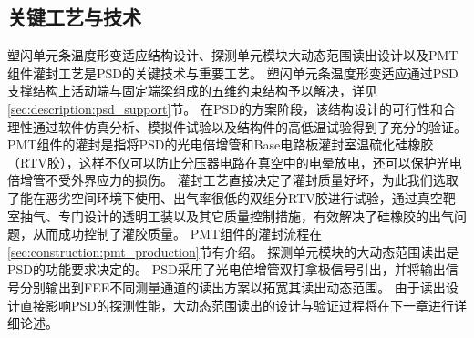 \subsection{关键工艺与技术}
塑闪单元条温度形变适应结构设计、探测单元模块大动态范围读出设计以及PMT组件灌封工艺是PSD的关键技术与重要工艺。
塑闪单元条温度形变适应通过PSD支撑结构上活动端与固定端梁组成的五维约束结构予以解决，详见\ref{sec:description:psd_support}节。
在PSD的方案阶段，该结构设计的可行性和合理性通过软件仿真分析、模拟件试验以及结构件的高低温试验得到了充分的验证。
PMT组件的灌封是指将PSD的光电倍增管和Base电路板灌封室温硫化硅橡胶（RTV胶），这样不仅可以防止分压器电路在真空中的电晕放电，还可以保护光电倍增管不受外界应力的损伤。
灌封工艺直接决定了灌封质量好坏，为此我们选取了能在恶劣空间环境下使用、出气率很低的双组分RTV胶进行试验，通过真空靶室抽气、专门设计的透明工装以及其它质量控制措施，有效解决了硅橡胶的出气问题，从而成功控制了灌胶质量。
PMT组件的灌封流程在\ref{sec:construction:pmt_production}节有介绍。
探测单元模块的大动态范围读出是PSD的功能要求决定的。
PSD采用了光电倍增管双打拿极信号引出，并将输出信号分别输出到FEE不同测量通道的读出方案以拓宽其读出动态范围。
由于读出设计直接影响PSD的探测性能，大动态范围读出的设计与验证过程将在下一章进行详细论述。
